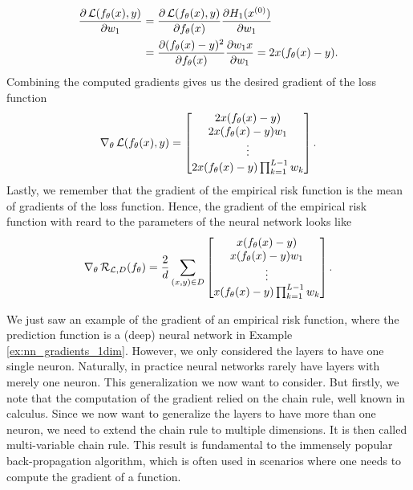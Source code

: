 \begin{example}
\begin{enumerate}
\begin{align*}
\frac{\partial \operatorname{\mathcal{L}} (f_{\theta}(x), y)}{ \partial w_1} &= \frac{\partial \operatorname{\mathcal{L}} (f_{\theta}(x), y)}{\partial f_{\theta}(x)} \frac{\partial H_1(x^{(0)})}{ \partial w_1}\\
&= \frac{\partial  (f_{\theta}(x) - y)^2}{\partial f_{\theta}(x)} \frac{\partial w_1x}{ \partial w_1} = 2x (f_{\theta}(x) - y).
\end{align*}
Combining the computed gradients gives us the desired gradient of the loss function
\begin{align*}
\nabla_\theta \operatorname{\mathcal{L}} (f_{\theta}(x), y) = \left[\begin{matrix}
2x (f_{\theta}(x) - y)\\
2x (f_{\theta}(x) - y) w_1\\
\vdots\\
2x (f_{\theta}(x) - y) \prod_{k=1}^{L-1} w_k
\end{matrix} \right].
\end{align*}
Lastly, we remember that the gradient of the empirical risk function is the mean of gradients of the loss function. Hence, the gradient of the empirical risk function with reard to the parameters of the neural network looks like
\begin{align*}
\nabla_{\theta}\operatorname{\mathcal{R}}_{\operatorname{\mathcal{L}}, D} (f_{\theta}) = \frac{2}{d} \sum_{(x, y)\in D} \left[\begin{matrix}
x (f_{\theta}(x) - y)\\
x (f_{\theta}(x) - y) w_1\\
\vdots\\
x (f_{\theta}(x) - y) \prod_{k=1}^{L-1} w_k
\end{matrix} \right].
\end{align*}
\end{enumerate}
\end{example}

We just saw an example of the gradient of an empirical risk function, where the prediction function is a (deep) neural network in Example \ref{ex:nn_gradients_1dim}. However, we only considered the layers to have one single neuron. Naturally, in practice neural networks rarely have layers with merely one neuron. This generalization we now want to consider. But firstly, we note that the computation of the gradient relied on the chain rule, well known in calculus. Since we now want to generalize the layers to have more than one neuron, we need to extend the chain rule to multiple dimensions. It is then called multi-variable chain rule. This result is fundamental to the immensely popular back-propagation algorithm, which is often used in scenarios where one needs to compute the gradient of a function.

